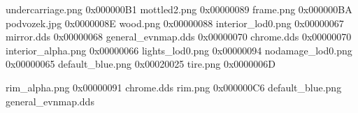 undercarriage.png 0x000000B1
mottled2.png 0x00000089
frame.png 0x000000BA
podvozek.jpg 0x0000008E
wood.png   0x00000088
interior_lod0.png 0x00000067
mirror.dds 0x00000068
general_evnmap.dds  0x00000070
chrome.dds    0x00000070
interior_alpha.png 0x00000066
lights_lod0.png  0x00000094
nodamage_lod0.png 0x00000065
default_blue.png   0x00020025
 tire.png 0x0000006D

rim_alpha.png 0x00000091
chrome.dds
rim.png 0x000000C6
default_blue.png
general_evnmap.dds